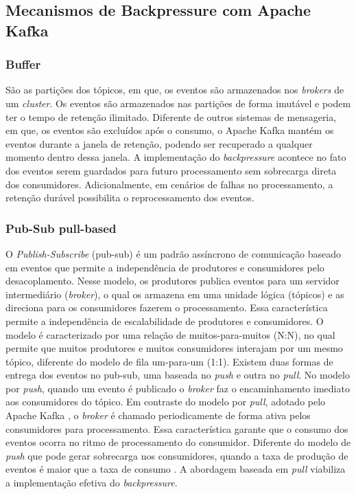 \documentclass[12pt]{article}
\begin{document}
  \subsection{Mecanismos de Backpressure com Apache Kafka}
  \subsubsection{Buffer}
  São as partições dos tópicos, em que, os eventos são armazenados nos \textit{brokers} de um \textit{cluster}. Os eventos são armazenados nas partições de forma imutável e podem ter o tempo de retenção ilimitado. Diferente de outros sistemas de mensageria, em que, os eventos são excluídos após o consumo, o Apache Kafka mantém os eventos durante a janela de retenção, podendo ser recuperado a qualquer momento dentro dessa janela. A implementação do \textit{backpressure} acontece no fato dos eventos serem guardados para futuro processamento sem sobrecarga direta dos consumidores. Adicionalmente, em cenários de falhas no processamento, a retenção durável possibilita o reprocessamento dos eventos.

  \subsubsection{Pub-Sub pull-based}
  O \textit{Publish-Subscribe} (pub-sub) é um padrão assíncrono de comunicação baseado em eventos que permite a independência de produtores e consumidores pelo desacoplamento. Nesse modelo, os produtores publica eventos para um servidor intermediário (\textit{broker}), o qual os armazena em uma unidade lógica (tópicos) e as direciona para os consumidores fazerem o processamento. Essa característica permite a independência de escalabilidade de produtores e consumidores. O modelo é caracterizado por uma relação de muitos-para-muitos (N:N), no qual permite que muitos produtores e muitos consumidores interajam por um mesmo tópico, diferente do modelo de fila um-para-um (1:1). Existem duas formas de entrega dos eventos no pub-sub, uma baseada no \textit{push} e outra no \textit{pull}. No modelo por \textit{push}, quando um evento é publicado  o \textit{broker} faz o encaminhamento imediato aos consumidores do tópico. Em contraste do modelo por \textit{pull}, adotado pelo Apache Kafka \cite{researchGateSagarkar2021}, o \textit{broker} é chamado periodicamente de forma ativa pelos consumidores para processamento. Essa característica garante que o consumo dos eventos ocorra no ritmo de processamento do consumidor. Diferente do modelo de \textit{push} que pode gerar sobrecarga nos consumidores, quando a taxa de produção de eventos é maior que a taxa de consumo \cite{apacheKafkaDesign2026}. A abordagem baseada em \textit{pull} viabiliza a implementação efetiva do \textit{backpressure}.
\end{document}
